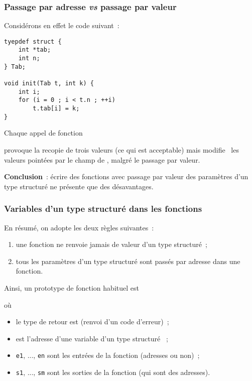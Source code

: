\begin{frame}[fragile]
\frametitle{Passage par adresse {\em vs} passage par valeur}
Considérons en effet le code suivant~:
\begin{multicols}{2}
\begin{lstlisting}
tyepdef struct {
    int *tab;
    int n;
} Tab;

void init(Tab t, int k) {
    int i;
    for (i = 0 ; i < t.n ; ++i)
        t.tab[i] = k;
}
\end{lstlisting}
\end{multicols}
Chaque appel de fonction
\begin{center}
\end{center}
provoque la recopie de trois valeurs (ce qui est acceptable) mais
\og modifie \fg\, les valeurs pointées par le champ  de ,
malgré le passage par valeur.
\bigskip

{\bf Conclusion}~: écrire des fonctions avec passage par valeur des
paramètres d'un type structuré ne présente que des désavantages.
\end{frame}

\begin{frame}[fragile]
\frametitle{Variables d'un type structuré dans les fonctions}
En résumé, on adopte les deux règles suivantes~:
\smallskip

\begin{enumerate}
    \item une fonction ne renvoie jamais de valeur d'un type structuré~;
    \smallskip

    \item tous les paramètres d'un type structuré sont passés par adresse
    dans une fonction.
\end{enumerate}
\medskip

Ainsi, un prototype de fonction habituel est
\begin{center}
\end{center}
où
\begin{itemize}
    \item le type de retour est  (renvoi d'un code d'erreur)~;
    \smallskip

    \item {} est l'adresse d'une variable d'un type structuré ~;
    \smallskip

    \item \textcolor{Rouge}{\tt e1}, ..., \textcolor{Rouge}{\tt en}
    sont les entrées de la fonction (adresses ou non)~;
    \smallskip

    \item \textcolor{Vert}{\tt s1}, ..., \textcolor{Vert}{\tt sm}
    sont les sorties de la fonction (qui sont des adresses).
\end{itemize}
\end{frame}

